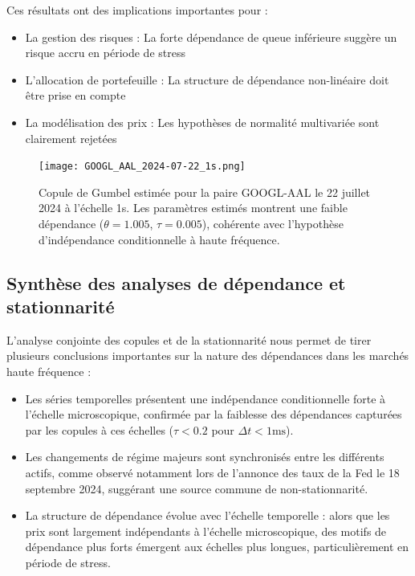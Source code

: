 \documentclass[10pt,a4paper]{article}
\theoremstyle{definition}
\theoremstyle{remark}
\begin{document}
\begin{itemize}
Ces résultats ont des implications importantes pour :
\begin{itemize}
    \item La gestion des risques : La forte dépendance de queue inférieure suggère un risque accru en période de stress
    \item L'allocation de portefeuille : La structure de dépendance non-linéaire doit être prise en compte
    \item La modélisation des prix : Les hypothèses de normalité multivariée sont clairement rejetées
\end{itemize}

\begin{figure}[h!]
\centering
    \texttt{[image: GOOGL\_AAL\_2024-07-22\_1s.png]}
    \caption{Copule de Gumbel estimée pour la paire GOOGL-AAL le 22 juillet 2024 à l'échelle 1s. Les paramètres estimés montrent une faible dépendance ($\theta = 1.005$, $\tau = 0.005$), cohérente avec l'hypothèse d'indépendance conditionnelle à haute fréquence.}
    \label{fig:copula_example}
\end{figure}




\subsection{Synthèse des analyses de dépendance et stationnarité}

L'analyse conjointe des copules et de la stationnarité nous permet de tirer plusieurs conclusions importantes sur la nature des dépendances dans les marchés haute fréquence :

\begin{itemize}
    \item Les séries temporelles présentent une indépendance conditionnelle forte à l'échelle microscopique, confirmée par la faiblesse des dépendances capturées par les copules à ces échelles ($\tau < 0.2$ pour $\Delta t < 1\text{ms}$).
    
    \item Les changements de régime majeurs sont synchronisés entre les différents actifs, comme observé notamment lors de l'annonce des taux de la Fed le 18 septembre 2024, suggérant une source commune de non-stationnarité.
    
    \item La structure de dépendance évolue avec l'échelle temporelle : alors que les prix sont largement indépendants à l'échelle microscopique, des motifs de dépendance plus forts émergent aux échelles plus longues, particulièrement en période de stress.
\end{itemize}


\end{itemize}
\end{document}

